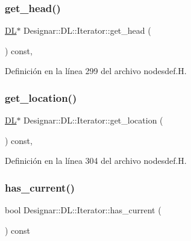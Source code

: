 \subsubsection{\texorpdfstring{get\+\_\+head()}{get\_head()}}
{\footnotesize\ttfamily \hyperlink{class_designar_1_1_d_l}{DL}$\ast$ Designar\+::\+D\+L\+::\+Iterator\+::get\+\_\+head (\begin{DoxyParamCaption}{ }\end{DoxyParamCaption}) const\hspace{0.3cm}{\ttfamily [inline]}, {\ttfamily [protected]}}



Definición en la línea 299 del archivo nodesdef.\+H.

\mbox{\label{class_designar_1_1_d_l_1_1_iterator_af9d1225d5fa038ec4868e0910d4b9da0}} 
\subsubsection{\texorpdfstring{get\+\_\+location()}{get\_location()}}
{\footnotesize\ttfamily \hyperlink{class_designar_1_1_d_l}{DL}$\ast$ Designar\+::\+D\+L\+::\+Iterator\+::get\+\_\+location (\begin{DoxyParamCaption}{ }\end{DoxyParamCaption}) const\hspace{0.3cm}{\ttfamily [inline]}, {\ttfamily [protected]}}



Definición en la línea 304 del archivo nodesdef.\+H.

\mbox{\label{class_designar_1_1_d_l_1_1_iterator_a02ccb7a5bbdc828ed8ac923f383661d4}} 
\subsubsection{\texorpdfstring{has\+\_\+current()}{has\_current()}}
{\footnotesize\ttfamily bool Designar\+::\+D\+L\+::\+Iterator\+::has\+\_\+current (\begin{DoxyParamCaption}{ }\end{DoxyParamCaption}) const\hspace{0.3cm}{\ttfamily [inline]}}



